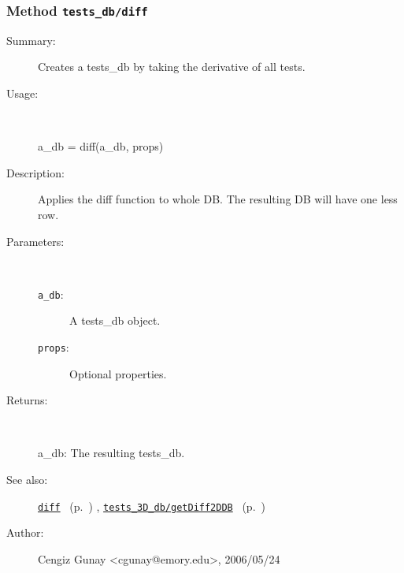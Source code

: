 \subsubsection[Method \texttt{diff}]{Method \texttt{tests\_db/diff}}%
%
\label{ref_tests_db__diff}%
\hypertarget{ref_tests_db__diff}{}%
\begin{description}
\item[Summary:]Creates a tests\_db by taking the derivative of all tests.
%
\item[Usage:]~%
\begin{lyxcode}%
a\_db = diff(a\_db, props)
%
\end{lyxcode}%
%
\item[Description:]%
Applies the diff function to whole DB. The resulting DB will have one less row.
\item[Parameters:]~
\begin{description}%
\item[\texttt{a\_db}:]
 A tests\_db object.
\item[\texttt{props}:]
 Optional properties.
\end{description}%
%
\item[Returns:]~

	a\_db: The resulting tests\_db.
%
%
\item[See also:]%
\hyperlink{ref_diff}{\texttt{diff}}%
\ (p.~\pageref{ref_diff})%
%
, \hyperlink{ref_tests_3D_db__getDiff2DDB}{\texttt{tests\_3D\_db/getDiff2DDB}}%
\ (p.~\pageref{ref_tests_3D_db__getDiff2DDB})%
%
%
\item[Author:]%
Cengiz Gunay <cgunay@emory.edu>, 2006/05/24%
\end{description}
\methodline%
